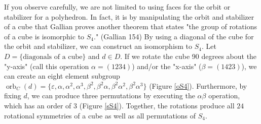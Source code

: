 \documentclass[11pt,twoside]{article}
\begin{document}
If you observe carefully, we are not limited to using faces for the orbit or stabilizer for a polyhedron.  In fact, it is by manipulating the orbit and stabilizer of a cube that Gallian proves another theorem that states "the group of rotations of a cube is isomorphic to $S_4$." (Gallian 154)  By using a diagonal of the cube for the orbit and stabilizer, we can construct an isomorphism to $S_4$.  Let $D = \{ \text{diagonals of a cube} \}$ and $d \in D$.  If we rotate the cube 90 degrees about the "y-axis" (call this operation $\alpha = (1234)$) and/or the "x-axis" ($\beta = (1423)$), we can create an eight element subgroup $\operatorname{orb}_{C}(d) = \{ \varepsilon, \alpha, \alpha^2, \alpha^3, \beta^2, \beta^2\alpha, \beta^2\alpha^2, \beta^2\alpha^3  \}$ (Figure \ref{oS4}).  Furthermore, by fixing $d$, we can produce three permutations by executing the $\alpha\beta$ operation, which has an order of $3$ (Figure \ref{sS4}).  Together, the rotations produce all $24$ rotational symmetries of a cube as well as all permutations of $S_4$.
\end{document}
